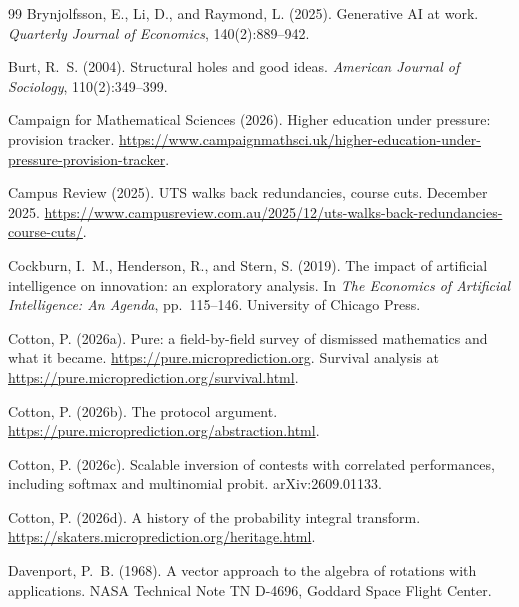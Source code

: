 \documentclass[11pt]{article}
\theoremstyle{definition}
\theoremstyle{remark}
\begin{document}
\begin{thebibliography}{99}
Brynjolfsson, E., Li, D., and Raymond, L. (2025).
\newblock Generative AI at work.
\newblock \emph{Quarterly Journal of Economics}, 140(2):889--942.

Burt, R.~S. (2004).
\newblock Structural holes and good ideas.
\newblock \emph{American Journal of Sociology}, 110(2):349--399.

Campaign for Mathematical Sciences (2026).
\newblock Higher education under pressure: provision tracker.
\newblock \url{https://www.campaignmathsci.uk/higher-education-under-pressure-provision-tracker}.

Campus Review (2025).
\newblock UTS walks back redundancies, course cuts.
\newblock December 2025. \url{https://www.campusreview.com.au/2025/12/uts-walks-back-redundancies-course-cuts/}.

Cockburn, I.~M., Henderson, R., and Stern, S. (2019).
\newblock The impact of artificial intelligence on innovation: an exploratory analysis.
\newblock In \emph{The Economics of Artificial Intelligence: An Agenda}, pp.\ 115--146. University of Chicago Press.

Cotton, P. (2026a).
\newblock Pure: a field-by-field survey of dismissed mathematics and what it became.
\newblock \url{https://pure.microprediction.org}. Survival analysis at \url{https://pure.microprediction.org/survival.html}.

Cotton, P. (2026b).
\newblock The protocol argument.
\newblock \url{https://pure.microprediction.org/abstraction.html}.

Cotton, P. (2026c).
\newblock Scalable inversion of contests with correlated performances, including softmax and multinomial probit.
\newblock arXiv:2609.01133.

Cotton, P. (2026d).
\newblock A history of the probability integral transform.
\newblock \url{https://skaters.microprediction.org/heritage.html}.

Davenport, P.~B. (1968).
\newblock A vector approach to the algebra of rotations with applications.
\newblock NASA Technical Note TN D-4696, Goddard Space Flight Center.


\end{thebibliography}
\end{document}
